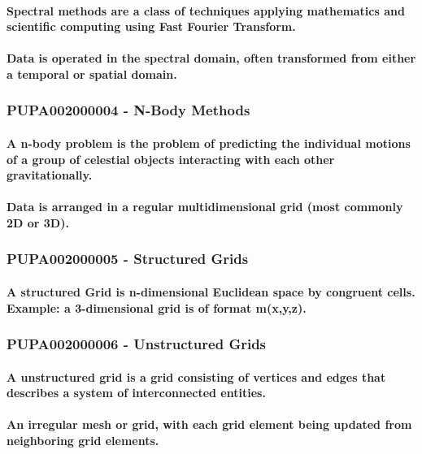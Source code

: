 \paragraph{Spectral methods are a class of techniques applying mathematics and scientific computing using Fast Fourier Transform.}
\paragraph{Data is operated in the spectral domain, often transformed from either a temporal or spatial domain.}
\subsubsection{PUPA002000004 - N-Body Methods}
\paragraph{A n-body problem is the problem of predicting the individual motions of a group of celestial objects interacting with each other gravitationally.}
\paragraph{Data is arranged in a regular multidimensional grid (most commonly 2D or 3D).}
\subsubsection{PUPA002000005 - Structured Grids}
\paragraph{A structured Grid is n-dimensional Euclidean space by congruent cells. Example: a 3-dimensional grid is of format m(x,y,z).}
\subsubsection{PUPA002000006 - Unstructured Grids}
\paragraph{A unstructured grid is a grid consisting of vertices and edges that describes a system of interconnected entities.}
\paragraph{An irregular mesh or grid, with each grid element being updated from neighboring grid elements.}
